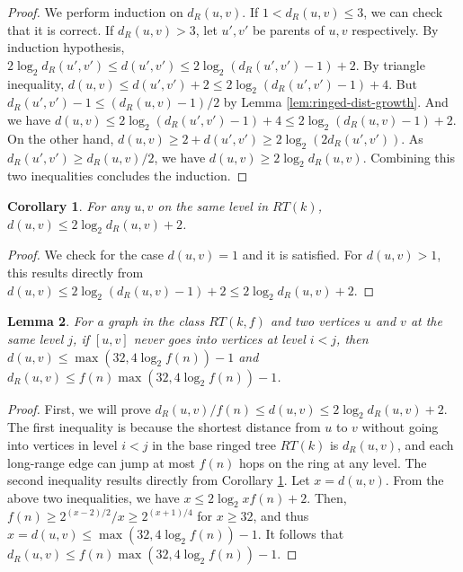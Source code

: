 \documentclass[11pt]{article}
\newtheorem{lem}{Lemma}
\newtheorem{coro}[lem]{Corollary}
\begin{document}
\begin{proof}
We perform induction on $d_R(u,v)$. If $1 < d_R(u,v) \leq 3$, we can check that it is correct. If $d_R(u,v) > 3$, let $u', v'$ be parents of $u,v$ respectively. By induction hypothesis, $2\log_2 d_R(u',v') \leq d(u',v') \leq 2\log_2 (d_R(u',v')-1) + 2$. 
By triangle inequality, $d(u,v) \le d(u',v') + 2 \leq 2\log_2 (d_R(u',v')-1) + 4$. But $d_R(u',v') - 1 \leq (d_R(u,v)-1)/2$ by Lemma \ref{lem:ringed-dist-growth}. And we have $d(u,v) \leq 2\log_2 (d_R(u',v')-1) + 4 \leq 2\log_2 (d_R(u,v)-1) + 2$. On the other hand, $d(u,v) \geq 2 + d(u',v') \geq 2\log_2 (2d_R(u',v'))$. As $d_R(u',v') \geq d_R(u,v)/2$, we have $d(u,v) \geq 2\log_2 d_R(u,v)$. Combining this two inequalities concludes the induction.
\end{proof}

\begin{coro}\label{coro:dist-estm-by-ring-dist}
For any $u,v$ on the same level in $RT(k)$, $d(u,v) \leq 2\log_2 d_R(u,v) + 2$.
\end{coro}

\begin{proof}
We check for the case $d(u,v)=1$ and it is satisfied. 
For $d(u,v)>1$, this results directly from $d(u,v) \leq 2\log_2 (d_R(u,v)-1) + 2 \leq 2\log_2 d_R(u,v) + 2$.
\end{proof}

\begin{lem}\label{lem:limited-jumps}
For a graph in the class $RT(k,f)$ and two vertices
	$u$ and $v$ at the same level $j$, 
	if $[u,v]$ never goes into vertices at level $i<j$, 
	then $d(u,v) \leq \max(32,4\log_2 f(n))-1$ and 
	$d_R(u,v) \leq f(n)\max(32,4\log_2 f(n))-1$.
\end{lem}
\begin{proof}
First, we will prove $d_R(u,v)/f(n) \leq d(u,v) \leq 2\log_2 d_R(u,v) + 2$.
The first inequality is because the shortest distance from $u$ to $v$
	without going into vertices in level $i < j$ in the base ringed
	tree $RT(k)$ is $d_R(u,v)$, and each long-range edge can jump at most
	$f(n)$ hops on the ring at any level.
The second inequality results directly from Corollary \ref{coro:dist-estm-by-ring-dist}.
Let $ x=d(u,v)$.
From the above two inequalities,  
	we have $x \leq 2\log_2 xf(n) + 2$.
Then, $f(n) \geq 2^{(x-2)/2}/x \geq 2^{(x+1)/4}$ for $x \geq 32$, 
	and thus $x=d(u,v) \leq \max(32,4\log_2 f(n))-1$. 
It follows that $d_R(u,v) \leq f(n)\max(32,4\log_2 f(n))-1$.
\end{proof}
\end{document}
